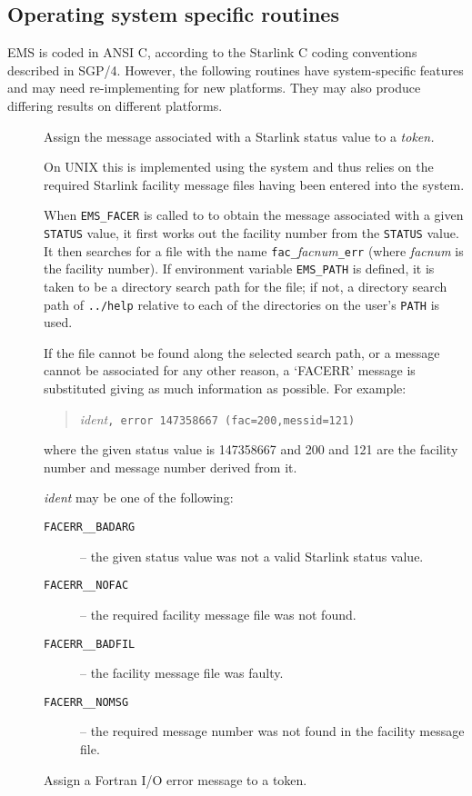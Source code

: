 \documentclass[twoside,11pt]{starlink}
\begin{document}
\subsection{Operating system
specific routines}
\label{deps}
EMS is coded in ANSI C, according to the Starlink C coding conventions
described in SGP/4.
However, the following routines have system-specific features and may need
re-implementing for new platforms.
They may also produce differing results on different platforms.
\begin {description}
\item []  Assign the message
associated with a Starlink status value to a \textit{token.}

On UNIX this is implemented using the  system
and thus relies on the required Starlink facility message files
having been entered into the system.

When \texttt{EMS\_FACER} is called to to obtain the message associated with a
given \texttt{STATUS} value, it first works out the facility number from the
\texttt{STATUS} value.
It then searches for a file with the name
\texttt{fac\_}\textit{facnum}\texttt{\_err} (where \textit{facnum} is the
facility number).
If environment variable \texttt{EMS\_PATH} is defined, it is taken to be a
directory search path for the file;
if not, a directory search path of \texttt{../help} relative to each of the
directories on the user's \texttt{PATH} is used.

If the file cannot be found along the selected search path, or
a message cannot be associated for any other reason, a `FACERR' message is
substituted giving as much information as possible.
For example:
\begin{quote}
\textit{ident}\texttt{, error 147358667 (fac=200,messid=121)}
\end{quote}
where the given status value is 147358667 and 200 and 121 are the facility
number and message number derived from it.

\textit{ident} may be one of the following:
\begin{description}
\item[\texttt{FACERR\_\_BADARG}] --
the given status value was not a valid Starlink status value.
\item[\texttt{FACERR\_\_NOFAC}] --
the required facility message file was not found.
\item[\texttt{FACERR\_\_BADFIL}] --
the facility message file was faulty.
\item[\texttt{FACERR\_\_NOMSG}] --
the required message number was not found in the facility message file.
\end{description}
\item []
Assign a Fortran I/O error message to a token.


\end{description}
\end{document}
